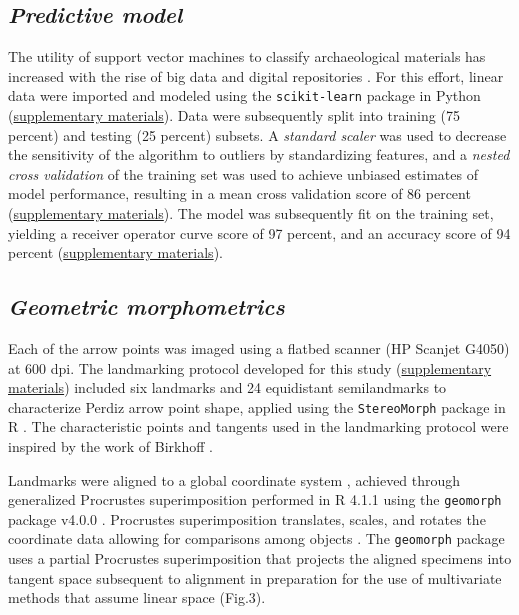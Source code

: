\documentclass[smallextended]{svjour3}       %
\begin{document}
\hypertarget{predictive-model}{%
\subsection{\texorpdfstring{\emph{Predictive
model}}{Predictive model}}\label{predictive-model}}

The utility of support vector machines to classify archaeological
materials has increased with the rise of big data and digital
repositories \cite{RN9515,RN9516,RN9514,RN9513}. For this effort, linear
data were imported and modeled using the \texttt{scikit-learn} package
in Python \cite{scikit-learn,sklearn_api}
(\href{https://seldenlab.github.io/perdiz3/}{supplementary materials}).
Data were subsequently split into training (75 percent) and testing (25
percent) subsets. A \emph{standard scaler} was used to decrease the
sensitivity of the algorithm to outliers by standardizing features, and
a \emph{nested cross validation} of the training set was used to achieve
unbiased estimates of model performance, resulting in a mean cross
validation score of 86 percent
(\href{https://seldenlab.github.io/perdiz3/}{supplementary materials}).
The model was subsequently fit on the training set, yielding a receiver
operator curve score of 97 percent, and an accuracy score of 94 percent
(\href{https://seldenlab.github.io/perdiz3/}{supplementary materials}).

\hypertarget{geometric-morphometrics}{%
\subsection{\texorpdfstring{\emph{Geometric
morphometrics}}{Geometric morphometrics}}\label{geometric-morphometrics}}

Each of the arrow points was imaged using a flatbed scanner (HP Scanjet
G4050) at 600 dpi. The landmarking protocol developed for this study
(\href{https://seldenlab.github.io/perdiz3/}{supplementary materials})
included six landmarks and 24 equidistant semilandmarks to characterize
Perdiz arrow point shape, applied using the \texttt{StereoMorph} package
in R \cite{RN8973}. The characteristic points and tangents used in the
landmarking protocol were inspired by the work of Birkhoff
\cite{RN5700}.

Landmarks were aligned to a global coordinate system
\cite{RN8102,RN8587,RN8384}, achieved through generalized Procrustes
superimposition \cite{RN8525} performed in R 4.1.1 \cite{RN8584} using
the \texttt{geomorph} package v4.0.0 \cite{RN8565}. Procrustes
superimposition translates, scales, and rotates the coordinate data
allowing for comparisons among objects \cite{RN5698,RN8525}. The
\texttt{geomorph} package uses a partial Procrustes superimposition that
projects the aligned specimens into tangent space subsequent to
alignment in preparation for the use of multivariate methods that assume
linear space \cite{RN8511,RN8384} (Fig.3).
\end{document}
